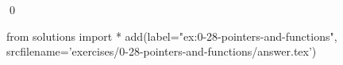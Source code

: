 
\begin{ex}
  \label{ex:0-28-pointers-and-functions}
  
  \qed
\end{ex}
\begin{python0}
from solutions import *
add(label="ex:0-28-pointers-and-functions",
    srcfilename='exercises/0-28-pointers-and-functions/answer.tex')
\end{python0}
